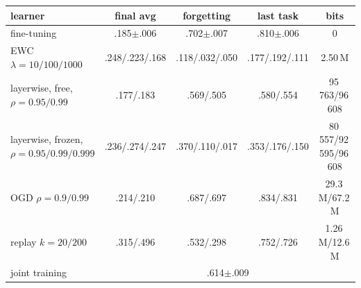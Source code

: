 \begin{tabular}{lcccc}
\toprule
learner & final avg & forgetting & last task & bits \\
\midrule
fine-tuning & .185$\pm$.006 & .702$\pm$.007 & .810$\pm$.006 & 0 \\
EWC $\lambda=10/100/1000$ & .248/.223/.168 & .118/.032/.050 & .177/.192/.111 & 2.50\,M \\
layerwise, free, $\rho=0.95/0.99$ & .177/.183 & .569/.505 & .580/.554 & 95\,763/96\,608 \\
layerwise, frozen, $\rho=0.95/0.99/0.999$ & .236/.274/.247 & .370/.110/.017 & .353/.176/.150 & 80\,557/92\,595/96\,608 \\
OGD $\rho=0.9/0.99$ & .214/.210 & .687/.697 & .834/.831 & 29.3\,M/67.2\,M \\
replay $k=20/200$ & .315/.496 & .532/.298 & .752/.726 & 1.26\,M/12.6\,M \\
joint training & \multicolumn{4}{c}{.614$\pm$.009} \\
\bottomrule
\end{tabular}
